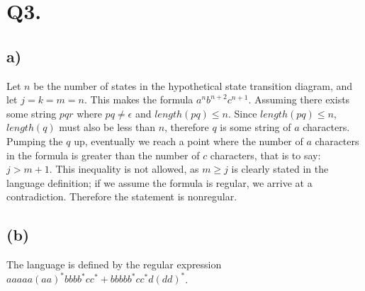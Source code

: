 \documentclass{article}
\begin{document}
	\section*{Q3.}
	\subsection*{a)}
	Let $n$ be the number of states in the hypothetical state transition diagram, and let $j = k = m = n$. This makes the formula $a^nb^{n+2}c^{n+1}$. Assuming there exists some string $pqr$ where $pq \neq \epsilon$ and $length(pq) \leq n$. Since $length(pq)\leq n$, $length(q)$ must also be less than $n$, therefore $q$ is some string of $a$ characters. Pumping the $q$ up, eventually we reach a point where the number of $a$ characters in the formula is greater than the number of $c$ characters, that is to say: $j > m+1$. This inequality is not allowed, as $m \geq j$ is clearly stated in the language definition; if we assume the formula is regular, we arrive at a contradiction. Therefore the statement is nonregular.
	\subsection*{(b)}
	The language is defined by the regular expression $aaaaa(aa)^*bbbb^*cc^*+bbbbb^*cc^*d(dd)^*$.
\end{document}
